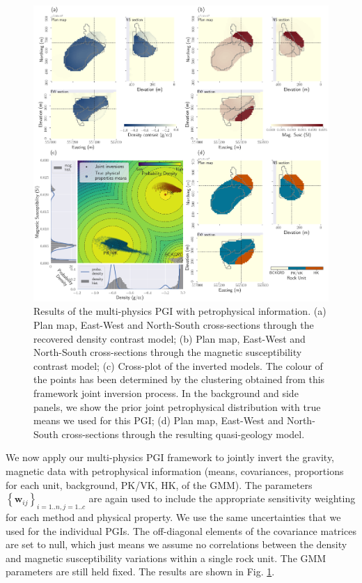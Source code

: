 \documentclass[extra, mreferee]{gji_joint} %
\begin{document}
\begin{figure}
    \centering
    \includegraphics[width=\textwidth]{Fig/LowRes/TKC_Joint_Synthetic.png}
    \caption{Results of the multi-physics PGI with petrophysical information. (a) Plan map, East-West and North-South cross-sections through the recovered density contrast model; (b) Plan map, East-West and North-South cross-sections through the magnetic susceptibility contrast model; (c) Cross-plot of the inverted models. The colour of the points has been determined by the clustering obtained from this framework joint inversion process. In the background and side panels, we show the prior joint petrophysical distribution with true means we used for this PGI; (d) Plan map, East-West and North-South cross-sections through the resulting quasi-geology model.}
    \label{fig:TKC_Joint_Synthetic.png}
\end{figure}

We now apply our multi-physics PGI framework to jointly invert the gravity, magnetic data with petrophysical information (means, covariances, proportions for each unit, background, PK/VK, HK, of the GMM). The parameters $\left\{\mathbf{w}_{ij}\right\}_{i=1..n, j=1..c}$ are again used to include the appropriate sensitivity weighting for each method and physical property. We use the same uncertainties that we used for the individual PGIs. The off-diagonal elements of the covariance matrices are set to null, which just means we assume no correlations between the density and magnetic susceptibility variations within a single rock unit. The GMM parameters are still held fixed. The results are shown in Fig. \ref{fig:TKC_Joint_Synthetic.png}.
\end{document}

